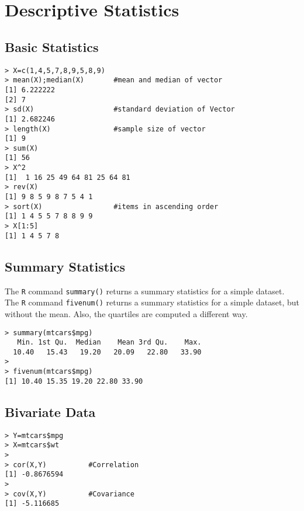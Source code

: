 
\chapter{Descriptive Statistics}

\section{Basic Statistics}

\footnotesize
\begin{myindentpar}{1cm}
\begin{verbatim}
> X=c(1,4,5,7,8,9,5,8,9)
> mean(X);median(X)       #mean and median of vector
[1] 6.222222
[2] 7
> sd(X)                   #standard deviation of Vector
[1] 2.682246
> length(X)               #sample size of vector
[1] 9
> sum(X)
[1] 56
> X^2
[1]  1 16 25 49 64 81 25 64 81
> rev(X)
[1] 9 8 5 9 8 7 5 4 1
> sort(X)                 #items in ascending order
[1] 1 4 5 5 7 8 8 9 9
> X[1:5]
[1] 1 4 5 7 8
\end{verbatim}
\end{myindentpar}
\normalsize


\section{Summary Statistics}
The \texttt{R} command \texttt{summary()} returns a summary statistics for a simple dataset.
The \texttt{R} command \texttt{fivenum()} returns a summary statistics for a simple dataset, but without the mean.
Also, the quartiles are computed a different way.

\footnotesize
\begin{myindentpar}{1cm}
\begin{verbatim}
> summary(mtcars$mpg)
   Min. 1st Qu.  Median    Mean 3rd Qu.    Max.
  10.40   15.43   19.20   20.09   22.80   33.90 
>
> fivenum(mtcars$mpg)
[1] 10.40 15.35 19.20 22.80 33.90
\end{verbatim}
\end{myindentpar}
\normalsize




\section{Bivariate Data}
\footnotesize \begin{myindentpar}{1cm}
\begin{verbatim}
> Y=mtcars$mpg
> X=mtcars$wt
>
> cor(X,Y)          #Correlation
[1] -0.8676594
>
> cov(X,Y)          #Covariance
[1] -5.116685
\end{verbatim}
\end{myindentpar}\normalsize

